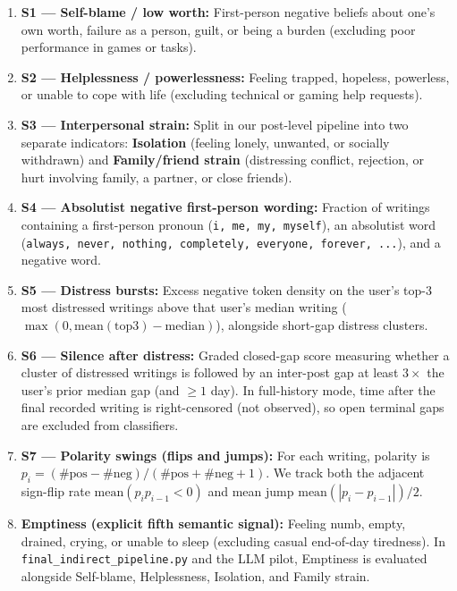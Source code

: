 \documentclass[11pt,a4paper]{article}
\begin{document}
\begin{enumerate}[nosep]
\item \textbf{S1 --- Self-blame / low worth:} First-person negative beliefs about one's own worth, failure as a person, guilt, or being a burden (excluding poor performance in games or tasks).
\item \textbf{S2 --- Helplessness / powerlessness:} Feeling trapped, hopeless, powerless, or unable to cope with life (excluding technical or gaming help requests).
\item \textbf{S3 --- Interpersonal strain:} Split in our post-level pipeline into two separate indicators: \textbf{Isolation} (feeling lonely, unwanted, or socially withdrawn) and \textbf{Family/friend strain} (distressing conflict, rejection, or hurt involving family, a partner, or close friends).
\item \textbf{S4 --- Absolutist negative first-person wording:} Fraction of writings containing a first-person pronoun (\texttt{i, me, my, myself}), an absolutist word (\texttt{always, never, nothing, completely, everyone, forever, ...}), and a negative word.
\item \textbf{S5 --- Distress bursts:} Excess negative token density on the user's top-3 most distressed writings above that user's median writing ($\max(0, \mathrm{mean}(\mathrm{top3}) - \mathrm{median})$), alongside short-gap distress clusters.
\item \textbf{S6 --- Silence after distress:} Graded closed-gap score measuring whether a cluster of distressed writings is followed by an inter-post gap at least $3\times$ the user's prior median gap (and $\ge 1$ day). In full-history mode, time after the final recorded writing is right-censored (not observed), so open terminal gaps are excluded from classifiers.
\item \textbf{S7 --- Polarity swings (flips and jumps):} For each writing, polarity is $p_i = (\text{\#pos} - \text{\#neg})/(\text{\#pos} + \text{\#neg} + 1)$. We track both the adjacent sign-flip rate $\mathrm{mean}(p_i p_{i-1} < 0)$ and mean jump $\mathrm{mean}(|p_i - p_{i-1}|)/2$.
\item \textbf{Emptiness (explicit fifth semantic signal):} Feeling numb, empty, drained, crying, or unable to sleep (excluding casual end-of-day tiredness). In \texttt{final\_indirect\_pipeline.py} and the LLM pilot, Emptiness is evaluated alongside Self-blame, Helplessness, Isolation, and Family strain.
\end{enumerate}
\end{document}
